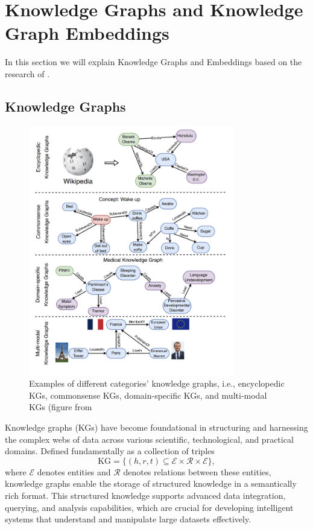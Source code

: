 \documentclass{article}
\begin{document}
\section{Knowledge Graphs and Knowledge Graph Embeddings}
In this section we will explain Knowledge Graphs and Embeddings based on the research of \textcite{Pan2023UnifyingLL}. 

\subsection{Knowledge Graphs}

\begin{figure}[!ht] %
  \centering %
  \includegraphics[width=0.8\textwidth]{KG_img.png} %
  \caption{Examples of different categories’ knowledge graphs, i.e., encyclopedic KGs, commonsense KGs, domain-specific KGs, and multi-modal KGs (figure from \textcite{Pan2023UnifyingLL}
} %
  \label{fig:KG_img} %
\end{figure}

Knowledge graphs (KGs) have become foundational in structuring and harnessing the complex webs of data across various scientific, technological, and practical domains. Defined fundamentally as a collection of triples 
\[
\text{KG} = \{(h, r, t) \subseteq \mathcal{E} \times \mathcal{R} \times \mathcal{E}\},
\]
where \(\mathcal{E}\) denotes entities and \(\mathcal{R}\) denotes relations between these entities, knowledge graphs enable the storage of structured knowledge in a semantically rich format. This structured knowledge supports advanced data integration, querying, and analysis capabilities, which are crucial for developing intelligent systems that understand and manipulate large datasets effectively.
\end{document}
